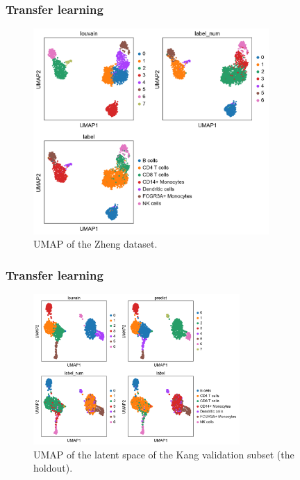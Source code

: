 \documentclass[final]{beamer}
\theoremstyle{plain}
\theoremstyle{definition}
\theoremstyle{remark}
\begin{document}
\begin{frame}
\frametitle{Transfer learning}
\begin{figure}[h]
\centering
\includegraphics[width=0.8\textwidth]{images/gmmvae_zheng_new_louvain_umap1.png}
\caption{
UMAP of the Zheng dataset.
}
\label{fig:zheng_pca_umap_new}
\end{figure}

\end{frame}


\begin{frame}
\frametitle{Transfer learning}
\begin{figure}[h]
\centering
\includegraphics[width=0.7\textwidth]{images/gmmvae_kang_new_latent_louvain_pred_umap1.png}
\caption{
UMAP of the latent space of the Kang validation subset (the holdout).
}
\label{fig:kang_new_latent}
\end{figure}
\end{frame}
\end{document}
